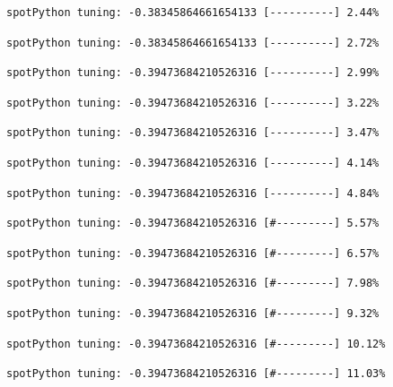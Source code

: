 \documentclass[
  letterpaper,
  DIV=11,
  numbers=noendperiod]{scrreprt}
\begin{document}
\begin{verbatim}
spotPython tuning: -0.38345864661654133 [----------] 2.44% 
\end{verbatim}

\begin{verbatim}
spotPython tuning: -0.38345864661654133 [----------] 2.72% 
\end{verbatim}

\begin{verbatim}
spotPython tuning: -0.39473684210526316 [----------] 2.99% 
\end{verbatim}

\begin{verbatim}
spotPython tuning: -0.39473684210526316 [----------] 3.22% 
\end{verbatim}

\begin{verbatim}
spotPython tuning: -0.39473684210526316 [----------] 3.47% 
\end{verbatim}

\begin{verbatim}
spotPython tuning: -0.39473684210526316 [----------] 4.14% 
\end{verbatim}

\begin{verbatim}
spotPython tuning: -0.39473684210526316 [----------] 4.84% 
\end{verbatim}

\begin{verbatim}
spotPython tuning: -0.39473684210526316 [#---------] 5.57% 
\end{verbatim}

\begin{verbatim}
spotPython tuning: -0.39473684210526316 [#---------] 6.57% 
\end{verbatim}

\begin{verbatim}
spotPython tuning: -0.39473684210526316 [#---------] 7.98% 
\end{verbatim}

\begin{verbatim}
spotPython tuning: -0.39473684210526316 [#---------] 9.32% 
\end{verbatim}

\begin{verbatim}
spotPython tuning: -0.39473684210526316 [#---------] 10.12% 
\end{verbatim}

\begin{verbatim}
spotPython tuning: -0.39473684210526316 [#---------] 11.03% 
\end{verbatim}
\end{document}
